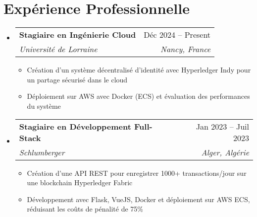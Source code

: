 \documentclass[letterpaper,12t]{article}
\makeatletter
\newcommand{\resumeItem}[1]{
  \item\small{
    {#1 \vspace{-2pt}}
  }
}
\newcommand{\resumeSubheading}[4]{
  \vspace{-2pt}\item
    \begin{tabular*}{0.97\textwidth}[t]{l@{\extracolsep{\fill}}r}
      \textbf{#1} & #2 \\
      \textit{\small#3} & \textit{\small #4} \\
    \end{tabular*}\vspace{-7pt}
}
\newcommand{\resumeSubHeadingListStart}{\begin{itemize}[leftmargin=0.15in, label={}]}
\newcommand{\resumeSubHeadingListEnd}{\end{itemize}}
\newcommand{\resumeItemListStart}{\begin{itemize}}
\newcommand{\resumeItemListEnd}{\end{itemize}\vspace{-5pt}}
\makeatother
\begin{document}
\section{Expérience Professionnelle}
    \resumeSubHeadingListStart

        \resumeSubheading
        {Stagiaire en Ingénierie Cloud}{Déc 2024 -- Present}
        {Université de Lorraine}{Nancy, France}
            \resumeItemListStart
                \resumeItem{Création d'un système décentralisé d'identité avec Hyperledger Indy pour un partage sécurisé dans le cloud}
                \resumeItem{Déploiement sur AWS avec Docker (ECS) et évaluation des performances du système}
            \resumeItemListEnd

        \resumeSubheading
        {Stagiaire en Développement Full-Stack}{Jan 2023 -- Juil 2023}
        {Schlumberger}{Alger, Algérie}
            \resumeItemListStart
                \resumeItem{Création d'une API REST pour enregistrer 1000+ transactions/jour sur une blockchain Hyperledger Fabric}
                \resumeItem{Développement avec Flask, VueJS, Docker et déploiement sur AWS ECS, réduisant les coûts de pénalité de 75\%}
            \resumeItemListEnd



    \resumeSubHeadingListEnd


\end{document}
